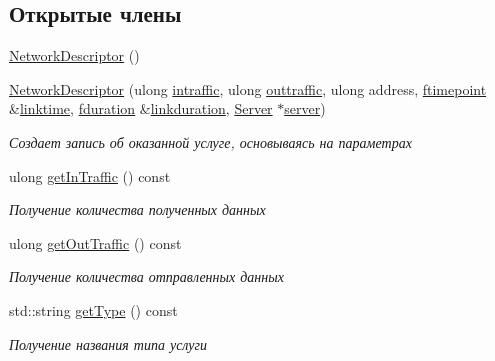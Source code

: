 \subsection*{Открытые члены}
\begin{DoxyCompactItemize}
\item 
\hyperlink{class_network_service_1_1_network_descriptor_a92164573b30dfe0650904c1bc32fb073}{Network\+Descriptor} ()
\item 
\hyperlink{class_network_service_1_1_network_descriptor_a06cc19962f4a5da19bb8bd7f3bdd9b8a}{Network\+Descriptor} (ulong \hyperlink{class_network_service_1_1_network_descriptor_ac4fc85cab905739a9513fcfd06ca0453}{intraffic}, ulong \hyperlink{class_network_service_1_1_network_descriptor_a109969d9199b67144184e1b296406edc}{outtraffic}, ulong address, \hyperlink{networkservice_8h_ac877dfabb0f4f6a8184aa821b447e81d}{ftimepoint} \&\hyperlink{class_network_service_1_1_service_descriptor_a08bfd17afce0cba1954d30bd76a14df4}{linktime}, \hyperlink{networkservice_8h_a476cc728ef971cba9111c75ea41a760a}{fduration} \&\hyperlink{class_network_service_1_1_network_descriptor_a30c7b2914f9a815341c0d11653f378db}{linkduration}, \hyperlink{class_network_service_1_1_server}{Server} $\ast$\hyperlink{class_network_service_1_1_service_descriptor_ad504b32ced44a75e0e02ea961d9434c4}{server})
\begin{DoxyCompactList}\small\item\em Создает запись об оказанной услуге, основываясь на параметрах \end{DoxyCompactList}\item 
ulong \hyperlink{class_network_service_1_1_network_descriptor_ad8d2c236158fd870ce202b03d07ce202}{get\+In\+Traffic} () const 
\begin{DoxyCompactList}\small\item\em Получение количества полученных данных \end{DoxyCompactList}\item 
ulong \hyperlink{class_network_service_1_1_network_descriptor_adbc216cb7c97d45161f5ec7c7c5a1aa7}{get\+Out\+Traffic} () const 
\begin{DoxyCompactList}\small\item\em Получение количества отправленных данных \end{DoxyCompactList}\item 
std\+::string \hyperlink{class_network_service_1_1_network_descriptor_abef35df6ca05d7b0ed9e3c0385b9a02a}{get\+Type} () const 
\begin{DoxyCompactList}\small\item\em Получение названия типа услуги \end{DoxyCompactList}\item 

\end{DoxyCompactItemize}
